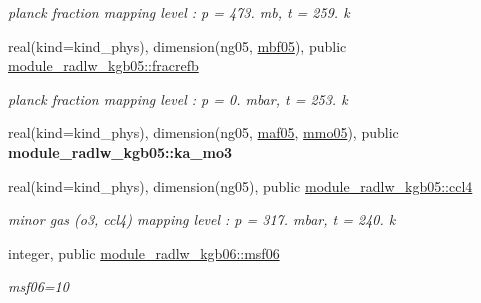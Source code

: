 \begin{DoxyCompactItemize}
\begin{DoxyCompactList}\small\item\em planck fraction mapping level \+: p = 473. mb, t = 259. k \end{DoxyCompactList}\item 
\mbox{\label{group__module__radlw__kgbnn_gaf7b1fd9c6b966e03a226dd8cbc058670}} 
real(kind=kind\+\_\+phys), dimension(ng05, \hyperlink{group__module__radlw__kgbnn_ga57db9a9cb9acac604df555038f6127a3}{mbf05}), public \hyperlink{group__module__radlw__kgbnn_gaf7b1fd9c6b966e03a226dd8cbc058670}{module\+\_\+radlw\+\_\+kgb05\+::fracrefb}
\begin{DoxyCompactList}\small\item\em planck fraction mapping level \+: p = 0. mbar, t = 253. k \end{DoxyCompactList}\item 
\mbox{\label{group__module__radlw__kgbnn_ga6021fc2f60379615b7882a28e1caa1e9}} 
real(kind=kind\+\_\+phys), dimension(ng05, \hyperlink{group__module__radlw__kgbnn_gaba904215976d7f4316b52c8f0cffe595}{maf05}, \hyperlink{group__module__radlw__kgbnn_gaa552aae4878030144218ca6c2bbe417f}{mmo05}), public {\bfseries module\+\_\+radlw\+\_\+kgb05\+::ka\+\_\+mo3}
\item 
\mbox{\label{group__module__radlw__kgbnn_ga15c6b3bfa9d8cbf20099dd4f364444b5}} 
real(kind=kind\+\_\+phys), dimension(ng05), public \hyperlink{group__module__radlw__kgbnn_ga15c6b3bfa9d8cbf20099dd4f364444b5}{module\+\_\+radlw\+\_\+kgb05\+::ccl4}
\begin{DoxyCompactList}\small\item\em minor gas (o3, ccl4) mapping level \+: p = 317. mbar, t = 240. k \end{DoxyCompactList}\item 
\mbox{\label{group__module__radlw__kgbnn_ga65f808aeb87457d383dd7f9366878fb9}} 
integer, public \hyperlink{group__module__radlw__kgbnn_ga65f808aeb87457d383dd7f9366878fb9}{module\+\_\+radlw\+\_\+kgb06\+::msf06}
\begin{DoxyCompactList}\small\item\em msf06=10 \end{DoxyCompactList}\item 

\end{DoxyCompactItemize}
